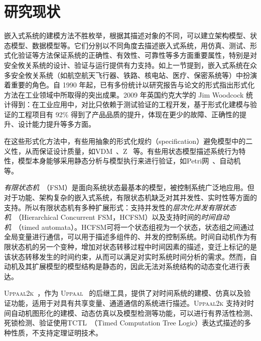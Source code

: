 \section{研究现状}

嵌入式系统的建模方法不胜枚举，根据其描述对象的不同，可以建立架构模型、状态模型、数据模型等。它们分别以不同角度去描述嵌入式系统，用仿真、测试、形式化验证等方法保证系统的正确性、有效性、可靠性等多方面重要属性，特别是对安全攸关系统的设计、验证与运行提供有力支持。如上一节提到，嵌入式系统在众多安全攸关系统（如航空航天飞行器、铁路、核电站、医疗、保密系统等）中扮演着重要的角色。自 1990 年起，已有多份统计以研究报告与论文的形式指出形式化方法在工业领域中所取得的突出成果。2009 年英国约克大学的 Jim Woodcock 统计得到\cite{DBLP:journals/csur/WoodcockLBF09}：在工业应用中，对比只依赖于测试验证的工程开发，基于形式化建模与验证的工程项目有 92\% 得到了产品品质的提升，体现在更少的故障、正确性的提升、设计能力提升等多方面。

在这些形式化方法中，有些用抽象的形式化规约（specification）避免模型中的二义性，从而保证设计质量，如VDM~\cite{DBLP:conf/fm/1978}、Z~\cite{DBLP:books/daglib/0067866} 等。有些用状态模型描述系统行为特性，模型本身能够采用静态分析与模型执行来进行验证，如Petri网~\cite{murata1989}、自动机~\cite{DBLP:books/aw/HopcroftU79} 等。 

\emph{有限状态机}~\cite{minsky1967computation}（FSM）是面向系统状态最基本的模型，被控制系统广泛地应用。但对于功能、架构复杂的嵌入式系统，有限状态机缺乏对其并发性、实时性等方面的支持。所以有限状态机有多种扩展形式：支持并发性的\emph{层次化并发有限状态机}~\cite{DBLP:journals/scp/Harel87}（Hierarchical Concurrent FSM，HCFSM）以及支持时间的\emph{时间自动机}~\cite{DBLP:journals/tcs/AlurD94,DBLP:conf/cav/Alur99}（timed automata）。HCFSM可将一个状态组视为一个状态，状态组之间通过全局变量进行通信，可以用于描述多组件的、并发的控制系统。时间自动机作为有限状态机的另一个变种，增加对状态转移过程中时间因素的描述，变迁上标记的是该状态转移发生的时间约束，从而可以满足对实时系统时间分析的需求。然而，自动机及其扩展模型的模型结构是静态的，因此无法对系统结构的动态变化进行表达。

\textsc{Uppaal2k}~\cite{larsen1999uppaal2k}，作为 \textsc{Uppaal}~\cite{DBLP:journals/sttt/LarsenPY97} 的后继工具，提供了对时间系统的建模、仿真以及验证功能，适用于对具有共享变量、通道通信的系统进行描述。\textsc{Uppaal2k} 支持对时间自动机图形化的建模、动态仿真以及模型检测等功能，可以进行有界活性检测、死锁检测、验证使用TCTL~\cite{DBLP:journals/logcom/BouchenebGR09}（Timed Computation Tree Logic）表达式描述的多种性质，不支持定理证明技术。

